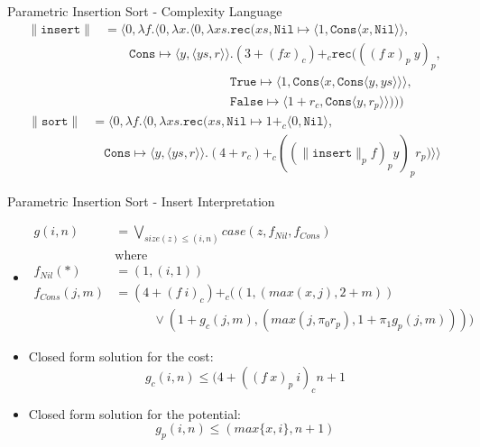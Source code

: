 \documentclass[pdf]{beamer}
\newcommand{\T}[1]{\texttt{#1}}
\newcommand{\LP}{\langle}
\newcommand{\RP}{\rangle}
\newcommand{\quadthree}{\qquad\quad}
\newcommand{\quadfour}{\quadthree\quad}
\newcommand{\quadfive}{\quadfour\quad}
\newcommand{\quadten}{\quadfive\quadfive}
\begin{document}
\begin{frame}{Parametric Insertion Sort - Complexity Language}
  \vfill
  \begin{align*}
    \|\T{insert}\| &= \LP 0, \lambda f. \LP 0, \lambda x.\LP 0,\lambda xs. \T{rec}(xs, \T{Nil} \mapsto \LP 1,\T{Cons}\LP x,\T{Nil}\RP\RP, \\
             &\quad\quad \T{Cons}\mapsto \LP y, \LP ys,r \RP\RP. (3 + (f x)_c) +_c \T{rec}(((f\ x)_p\ y)_p, \\
             &\quadten\T{True}\mapsto \LP 1, \T{Cons}\LP x,\T{Cons}\LP y,ys\RP\RP\RP, \\
             &\quadten\T{False}\mapsto \LP 1 + r_c, \T{Cons}\LP y,r_p\RP\RP)))
  \end{align*}
  \vfill
  \begin{align*}
    \|\T{sort}\| &= \LP 0, \lambda f.\LP 0,\lambda xs.\T{rec}(xs, \T{Nil} \mapsto 1 +_c \LP 0,\T{Nil}\RP, \\
               &\quad \T{Cons} \mapsto \LP y,\LP ys,r \RP\RP.(4 + r_c) +_c ((\|\T{insert}\|_p f)_p y)_p r_p)\RP\RP
  \end{align*}
  \vfill
\end{frame}

\begin{frame}{Parametric Insertion Sort - Insert Interpretation}
  \begin{itemize}
    \item[]
      \small
      \begin{align*}
      g(i,n) &= \bigvee\limits_{size(z) \leq (i,n)} case(z, f_{Nil}, f_{Cons}) \\
             &\text{where}\\
      f_{Nil}(\ast) &= (1, (i, 1)) \\
      f_{Cons}(j,m) &= (4 + (f\ i)_c) +_c ((1, (max(x,j), 2 + m)) \\
                    &\quadthree \vee (1 + g_c(j,m), (max(j,\pi_0 r_p), 1 + \pi_1 g_p(j,m))))
      \end{align*}
    \item Closed form solution for the cost:
      \[g_c(i,n) \leq (4 + ((f\ x)_p\ i)_c n + 1\]
    \item Closed form solution for the potential:
      \[g_p(i,n) \leq (max\{x, i\}, n+1)\]
  \end{itemize}
\end{frame}
\end{document}
